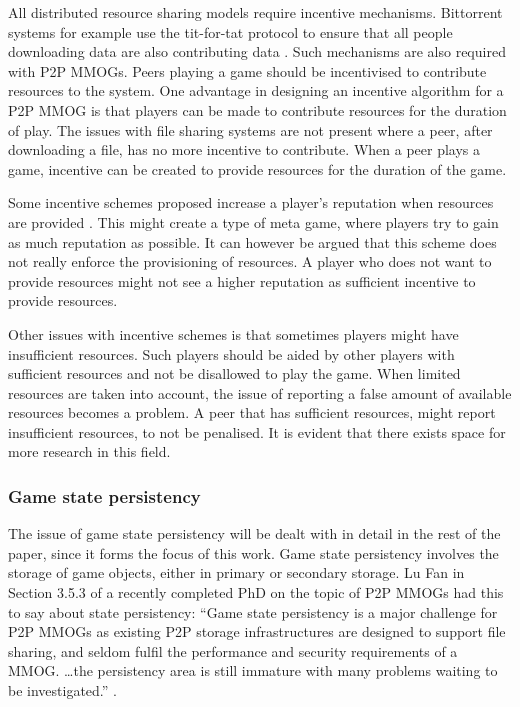 \documentclass[10pt,a4paper,journal,cspaper,compsoc]{IEEEtran}
\begin{document}
All distributed resource sharing models require incentive mechanisms. Bittorrent systems for example use the tit-for-tat protocol to ensure that all
people downloading data are also contributing data \cite{tit_for_tat}. Such mechanisms are also required with P2P MMOGs. Peers playing a game should
be incentivised to contribute resources to the system. One advantage in designing an incentive algorithm for a P2P MMOG is that players can be made
to contribute resources for the duration of play. The issues with file sharing systems are not present where a peer, after downloading a file, has no
more incentive to contribute. When a peer plays a game, incentive can be created to provide resources for the duration of the game.

Some incentive schemes proposed increase a player's reputation when resources are provided \cite{classic_p2p_reputation} \cite{proactive_reputation}.
This might create a type of meta game, where players try to gain as much reputation as possible. It can however be argued that this scheme does not
really enforce the provisioning of resources. A player who does not want to provide resources might not see a higher reputation as sufficient
incentive to provide resources.

Other issues with incentive schemes is that sometimes players might have insufficient resources. Such players should be aided by other players with
sufficient resources and not be disallowed to play the game. When limited resources are taken into account, the issue of reporting a false amount of
available resources becomes a problem. A peer that has sufficient resources, might report insufficient resources, to not be penalised. It is evident
that there exists space for more research in this field.

\subsubsection{Game state persistency}

The issue of game state persistency will be dealt with in detail in the rest of the paper, since it forms the focus of this work. Game state
persistency involves the storage of game objects, either in primary or secondary storage. Lu Fan in Section 3.5.3 of a recently completed PhD on the
topic of P2P MMOGs had this to say about state persistency: ``Game state persistency is a major challenge for P2P MMOGs as existing P2P storage
infrastructures are designed to support file sharing, and seldom fulfil the performance and security requirements of a MMOG. \ldots the persistency
area is still immature with many problems waiting to be investigated.'' \cite{Fan_phd}.
\end{document}
